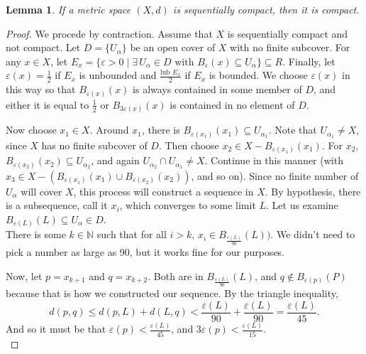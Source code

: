 \documentclass[12pt]{report}
\newcommand{\exst}{\exists\,}
\newcommand{\nin}{\not \in}
\newcommand{\naturals}{\mathbb{N}}
\newcommand{\eball}{B_\varepsilon}
\newcommand{\ball}[1]{B_{#1}}
\newtheorem{lemma}[theorem]{Lemma}
\begin{document}
\begin{lemma}
If a metric space $(X,d)$ is sequentially compact, then it is compact.
\end{lemma}

\begin{proof}
We procede by contraction. Assume that $X$ is sequentially compact and not
compact. Let $D = \{U_\alpha\}$ be an open cover of $X$ with no finite
subcover. For any $x \in X$, let $E_x = \{ \varepsilon > 0 \mid 
\exst U_\alpha \in D \textrm { with } \eball(x) \subseteq U_\alpha \}
\subseteq R$. Finally, let $\varepsilon(x) = \frac{1}{2}$ if $E_x$ is
unbounded and
$\frac{\textrm{lub }E_x}{2}$ if $E_x$ is bounded. We choose $\varepsilon(x)$ in this
way so that $\ball{\varepsilon(x)}(x)$ is always contained in some member of
$D$, and either it is  equal to $\frac{1}{2}$ or $\ball{3\varepsilon(x)}(x)$
is contained in no element of $D$.

Now choose $x_1 \in X$. Around $x_1$, there is 
$\ball{\varepsilon(x_1)}(x_1) \subseteq U_{\alpha_1}$. Note that 
$U_{\alpha_1} \neq X$, since $X$ has no finite subcover of $D$.
Then choose $x_2 \in X - \ball{\varepsilon(x_1)}(x_1)$. For $x_2$,
$\ball{\varepsilon(x_2)}(x_2) \subseteq U_{\alpha_2}$, and again 
$U_{\alpha_2} \cap U_{\alpha_1} \neq X$. 
Continue in this manner (with $x_3 \in X - (\ball{\varepsilon(x_1)}(x_1) \cup
\ball{\varepsilon(x_2)}(x_2))$, and so on). Since no finite number of
$U_\alpha$ will cover $X$, this process will
construct a sequence in $X$. By hypothesis, there is a subsequence,
call it $x_{i}$, which converges to some limit $L$.  Let us examine
$\ball{\varepsilon(L)}(L) \subseteq U_\alpha \in D$.\\



There is some $k \in \naturals$ such that for all $i > k$, $x_i \in
\ball{\frac{\varepsilon(L)}{90}}(L))$. We didn't need to pick a number as
large as 90, but it works fine for our purposes. 

Now, let $p = x_{k+1}$ and $q = x_{k+2}$. Both are in
$\ball{\frac{\varepsilon(L)}{90}}(L)$, and $q \nin \ball{\varepsilon(p)}(P)$
because that is how we constructed our sequence. By the triangle inequality, 
\begin{displaymath}
d(p,q) \leq d(p,L) + d(L,q) < \frac{\varepsilon(L)}{90} +
\frac{\varepsilon(L)}{90} = \frac{\varepsilon(L)}{45}.
\end{displaymath}
And so it must be that $\varepsilon(p) < \frac{\varepsilon(L)}{45}$, and $3\varepsilon(p) <
\frac{\varepsilon(L)}{15}$. \\


\end{proof}
\end{document}
